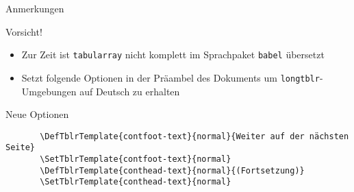 \begin{frame}[fragile]{Anmerkungen}
  \begin{alertblock}{Vorsicht!}
     \begin{itemize}
       \item Zur Zeit ist \texttt{tabularray} nicht komplett im Sprachpaket \texttt{babel} übersetzt
     \end{itemize}
  \end{alertblock}
  \begin{itemize}
    \item Setzt folgende Optionen in der Präambel des Dokuments um \texttt{longtblr}-Umgebungen auf Deutsch zu erhalten
  \end{itemize}
  \begin{block}{Neue Optionen}
    \begin{verbatim}
       \DefTblrTemplate{contfoot-text}{normal}{Weiter auf der nächsten Seite}
       \SetTblrTemplate{contfoot-text}{normal}
       \DefTblrTemplate{conthead-text}{normal}{(Fortsetzung)}
       \SetTblrTemplate{conthead-text}{normal}
     \end{verbatim}
  \end{block}
\end{frame}
